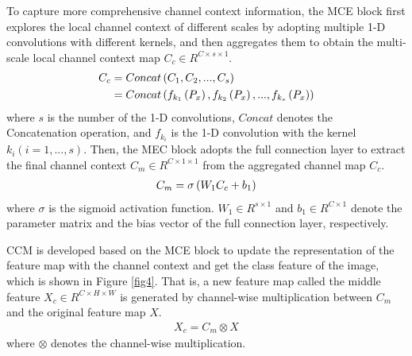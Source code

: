 \documentclass[10pt,journal,cspaper,compsoc]{IEEEtran}
\begin{document}
To capture more comprehensive channel context information, the MCE block first explores the local channel context of different scales by adopting multiple 1-D convolutions with different kernels, and then aggregates them to obtain the multi-scale local channel context map $C_{c}\in R^{C\times s\times 1}$.
\begin{align}
{C_c}&= Concat\left ( C_{1},C_{2},...,C_{s} \right )\notag\\
&=Concat\left ( f_{k_1}\left ( P_{x} \right ),f_{k_2}\left ( P_{x} \right ),...,f_{k_s}\left ( P_{x} \right ) \right)
\end{align}
where $s$ is the number of the 1-D convolutions, $Concat$ denotes the Concatenation operation, and $f_{k_{i}}$ is the 1-D convolution with the kernel $k_{i} (i = 1,...,s)$. Then, the MEC block adopts the full connection layer to extract the final channel context $C_{m}\in{R}^{C\times 1\times 1}$ from the aggregated channel map $C_{c}$.
\begin{equation}
	\\\begin{array}{l}
	C_{m}= \sigma \left ( W_{1}C_{c}+ b_{1} \right )
	\end{array}
\end{equation}
where $\sigma$ is the sigmoid activation function. $W_{1}\in R^{s\times 1}$ and $b_{1}\in R^{C\times 1}$ denote the parameter matrix and the bias vector of the full connection layer, respectively.
	
CCM is developed based on the MCE block to update the representation of the feature map with the channel context and get the class feature of the image, which is shown in Figure \ref{fig4}. That is, a new feature map called the middle feature $X_{c}\in R^{C\times H\times W}$ is generated by channel-wise multiplication between $C_{m}$ and the original feature map $X$.
\begin{align}
	{X_c} = {C_m} \otimes X
\end{align}
where $\otimes$ denotes the channel-wise multiplication.
	
\end{document}

